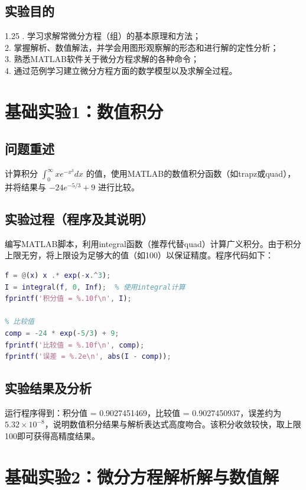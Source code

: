 \documentclass[12pt,a4paper]{article}
\begin{document}
\subsection*{实验目的}
\begin{spacing}{1.25}
. 学习求解常微分方程（组）的基本原理和方法；\\
2. 掌握解析、数值解法，并学会用图形观察解的形态和进行解的定性分析；\\
3. 熟悉MATLAB软件关于微分方程求解的各种命令；\\
4. 通过范例学习建立微分方程方面的数学模型以及求解全过程。
\end{spacing}

\section*{基础实验1：数值积分}
\subsection*{问题重述}
计算积分 \(\displaystyle \int_{0}^{\infty} x e^{-x^{3}} dx\) 的值，使用MATLAB的数值积分函数（如trapz或quad），并将结果与 \(-24 e^{-5/3} + 9\) 进行比较。

\subsection*{实验过程（程序及其说明）}
编写MATLAB脚本，利用integral函数（推荐代替quad）计算广义积分。由于积分上限无穷，将上限设为足够大的值（如100）以保证精度。程序代码如下：
\begin{lstlisting}[language=Matlab, caption={实验1代码}]
% 实验1：数值积分
f = @(x) x .* exp(-x.^3);
I = integral(f, 0, Inf);  % 使用integral计算
fprintf('积分值 = %.10f\n', I);

% 比较值
comp = -24 * exp(-5/3) + 9;
fprintf('比较值 = %.10f\n', comp);
fprintf('误差 = %.2e\n', abs(I - comp));
\end{lstlisting}

\subsection*{实验结果及分析}
运行程序得到：积分值 = 0.9027451469，比较值 = 0.9027450937，误差约为 \(5.32\times10^{-8}\)，说明数值积分结果与解析表达式高度吻合。该积分收敛较快，取上限100即可获得高精度结果。

\section*{基础实验2：微分方程解析解与数值解}
\end{document}
